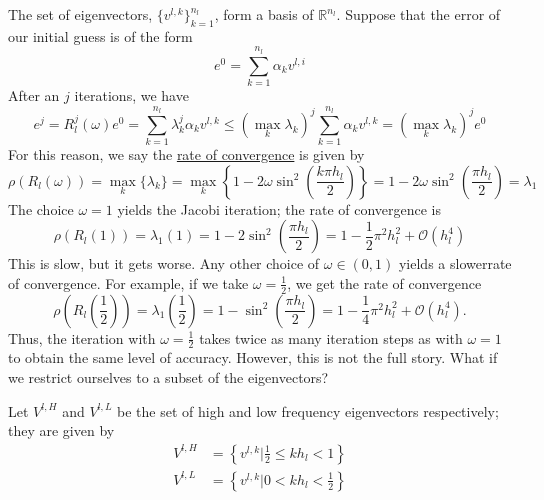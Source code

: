 \documentclass[a4paper,10pt,oneside]{book}
\theoremstyle{plain}%
\theoremstyle{definition}
\theoremstyle{remark}
\newcommand{\bbR}{\mathbb{R}}
\newcommand{\hl}{h_l} %
\newcommand{\Omegal}{\Omega_l} %
\newcommand{\nl}{n_l} %
\begin{document}
The set of eigenvectors, $\{v^{l,k}\}_{k=1}^{n_l}$, form a basis of
$\bbR^{\nl}$.
Suppose that the error of our initial guess is of the form
\begin{equation}
 e^0=\sum_{k=1}^{\nl}\alpha_kv^{l,i}
\end{equation}
After an $j$ iterations, we have
\begin{equation}
 e^j=R_l^j(\omega)e^0=\sum_{k=1}^{\nl}\lambda_k^j\alpha_kv^{l,k}\leq\left(\max_k
{\lambda_k}\right)^j\sum_{k=1}^{\nl}\alpha_kv^{l,k}=\left(\max_k{\lambda_k}
\right)^je^0
\end{equation}
For this reason, we say the \underline{rate of convergence} is given by
\begin{equation}
 \rho(R_l(\omega)) = \max_k\{\lambda_k\} =
\max_k\left\{1-2\omega\sin^2\left(\frac{k\pi \hl}{2}\right)\right\} =
1-2\omega\sin^2\left(\frac{\pi \hl}{2}\right) = \lambda_1
\end{equation}
The choice $\omega=1$ yields the Jacobi iteration; the rate of convergence is
\begin{equation}
 \rho(R_l(1)) = \lambda_1(1) = 1-2\sin^2\left(\frac{\pi h_l}{2}\right) =
1-\frac{1}{2}\pi^2h_l^2+\mathcal{O}(h_l^4)
\end{equation}
This is slow, but it gets worse. Any other choice of $\omega\in(0,1)$ yields a 
slowerrate of convergence. For example, if we take $\omega=\frac{1}{2}$, we get
the rate of convergence
\begin{equation}
 \rho\left(R_l\left(\frac{1}{2}\right)\right) =
\lambda_1\left(\frac{1}{2}\right) = 1-\sin^2\left(\frac{\pi h_l}{2}\right) =
1-\frac{1}{4}\pi^2h_l^2+\mathcal{O}(h_l^4).
\end{equation}
Thus, the iteration with $\omega=\frac{1}{2}$ takes twice as many iteration
steps as with $\omega=1$ to obtain the same level of accuracy. However, this is
not the full story. What if we restrict ourselves to a subset of the
eigenvectors?

Let $V^{l,H}$ and $V^{l,L}$ be the set of high and low frequency eigenvectors
respectively; they are given by
\begin{align}
 V^{l,H}&=\left\{v^{l,k}\bigg|\frac{1}{2}\leq k\hl<1\right\}\\
 V^{l,L}&=\left\{v^{l,k}\bigg|0<k\hl<\frac{1}{2}\right\}
\end{align}
\end{document}
